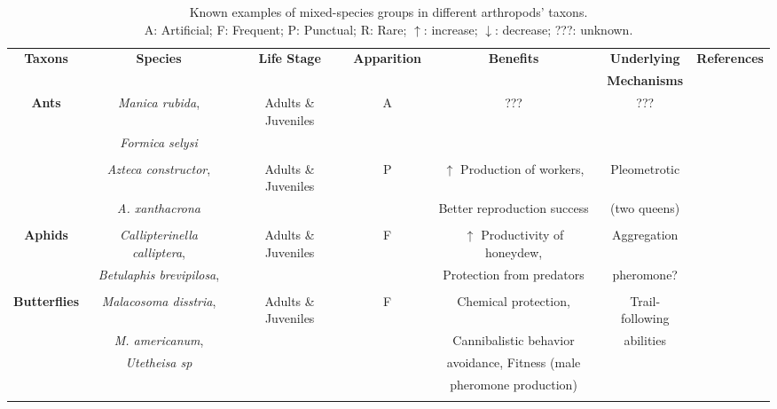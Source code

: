 \begin{landscape}
\begin{table}
	\caption{Known examples of mixed-species groups in different arthropods’ taxons.\\ A: Artificial; F: Frequent; P: Punctual; R: Rare; $\uparrow$: increase; $\downarrow$: decrease; ???: unknown.}
	\label{tab:mixedsp}
	\centering
	\begin{tabular*}{\linewidth}{@{\extracolsep{\fill}}ccccccc}
		 \toprule
         \textbf{Taxons}				& \textbf{Species}		& \textbf{Life Stage}		& \textbf{Apparition}		& \textbf{Benefits}		&\textbf{Underlying}		&\textbf{References}\\
									&		&		&		&		& \textbf{Mechanisms}		&\\
		 \midrule
		\textbf{Ants}	& \textit{Manica rubida},		& Adults \& Juveniles		& A		&???		&???		&\citep{fielde_artificial_1903,errard_development_1994,vienne_congruency_1995}\\
        					& \textit{Formica selysi}	&	&	&	&	&\\	
            &	&	&	&	&	&\\                
        	& \textit{Azteca constructor},	& Adults \& Juveniles	&P	& $\uparrow$ Production of workers,	& Pleometrotic	&\citep{choe_evolution_1997,aron_les_2009}\\ 
            & \textit{A. xanthacrona}	&	&	&Better reproduction success	& (two queens)	&\\
            &	&	&	&	&	&\\
        
		\textbf{Aphids}	& \textit{Callipterinella calliptera},		& Adults \& Juveniles		& F		& $\uparrow$ Productivity of honeydew,	&Aggregation 	& \cite{hajek_coexistence_1986} \\
        & \textit{Betulaphis brevipilosa},	&	&	&Protection from predators	&pheromone?	& \\
        &	&	&	&	&	&\\

		\textbf{Butterflies}	& \textit{Malacosoma disstria},		& Adults \& Juveniles		&F		&Chemical protection,	&Trail-following 	&\citep{fitzgerald_specificity_1979,bogner_interspecific_1996}\\
        &\textit{M. americanum},	&	&	& Cannibalistic behavior	&abilities	&\\
        &\textit{Utetheisa sp}	&	&	&avoidance, Fitness (male	&	&\\
        &	&	&	&pheromone production)	&	&\\
        &	&	&	&	&	&\\
        

\end{tabular*}
\end{table}
\end{landscape}
